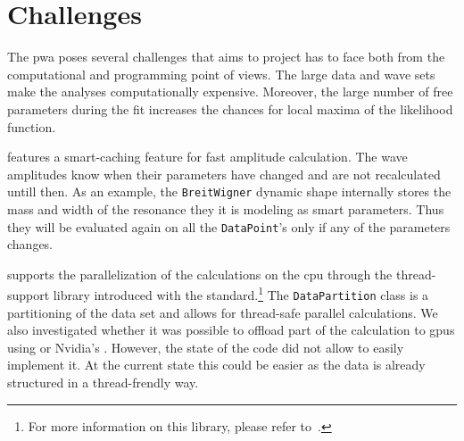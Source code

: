%
%
%

    \section{Challenges}

        The \ac{pwa} poses several challenges that  aims to project has to face both from the computational and programming point of views.
        The large data and wave sets make the analyses computationally expensive.
        Moreover, the large number of free parameters during the fit increases the chances for local maxima of the likelihood function.


         features a smart-caching feature for fast amplitude calculation.
        The wave amplitudes know when their parameters have changed and are not recalculated untill then.
        As an example, the \lstinline!BreitWigner! dynamic shape internally stores the mass and width of the resonance they it is modeling as smart parameters.
        Thus they will be evaluated again on all the \lstinline!DataPoint!'s only if any of the parameters changes.




         supports the parallelization of the calculations on the \acs{cpu} through the thread-support library introduced with the  standard.\footnote{For more information on this library, please refer to~\cite[chap.~?]{effective_modern_cpp_meyers}.}
        The \lstinline!DataPartition! class is a partitioning of the data set and allows for thread-safe parallel calculations.
        We also investigated whether it was possible to offload part of the calculation to \acsp{gpu} using  or Nvidia's .
        However, the state of the code did not allow to easily implement it.
        At the current state this could be easier as the data is already structured in a thread-frendly way.


